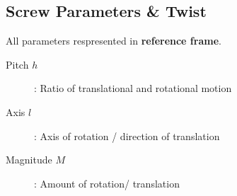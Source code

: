 \subsection{Screw Parameters \& Twist}
        All parameters respresented in \textbf{reference frame}.
    \begin{description}
        \item[Pitch $h$]: Ratio of translational and rotational motion
        \item[Axis $l$]: Axis of rotation / direction of translation
        \item[Magnitude $M$]: Amount of rotation/ translation  
    \end{description}

